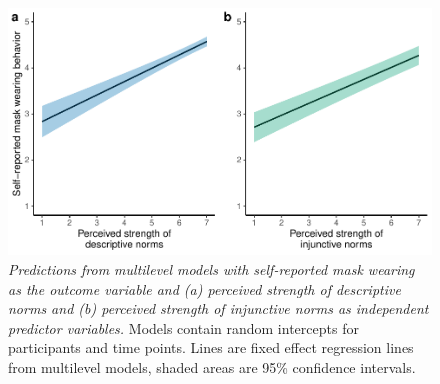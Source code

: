 \documentclass[
  man, donotrepeattitle,mask,floatsintext]{apa6}
\begin{document}
\begin{figure}
\centering
\includegraphics{manuscript_files/figure-latex/plotCorBehNorm-1.pdf}
\caption{\label{fig:plotCorBehNorm}\emph{Predictions from multilevel models with self-reported mask wearing as the outcome variable and (a) perceived strength of descriptive norms and (b) perceived strength of injunctive norms as independent predictor variables.} Models contain random intercepts for participants and time points. Lines are fixed effect regression lines from multilevel models, shaded areas are 95\% confidence intervals.}
\end{figure}

\newpage
\end{document}

